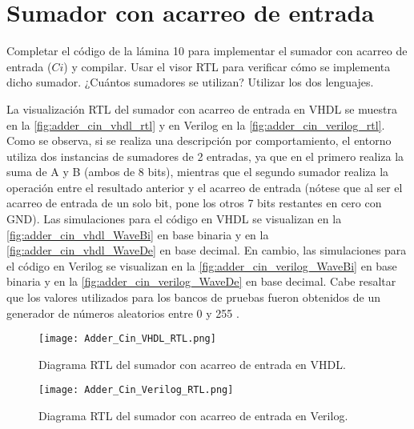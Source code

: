 \section{Sumador con acarreo de entrada \label{sec:s1}}

\begin{center}
	\begin{minipage}{12cm}
		\begin{tcolorbox}[title=Actividad 1]
			Completar el código de la lámina 10 para implementar el sumador con acarreo de entrada ($Ci$) y compilar. Usar el visor RTL para verificar cómo se implementa dicho sumador. ¿Cuántos sumadores se utilizan? Utilizar los dos lenguajes.
		\end{tcolorbox}	
	\end{minipage}
\end{center}

La visualización RTL del sumador con acarreo de entrada en VHDL se muestra en la \autoref{fig:adder_cin_vhdl_rtl} y en Verilog en la \autoref{fig:adder_cin_verilog_rtl}. Como se observa, si se realiza una descripción por comportamiento, el entorno utiliza dos instancias de sumadores de 2 entradas, ya que en el primero realiza la suma de A y B (ambos de 8 bits), mientras que el segundo sumador realiza la operación entre el resultado anterior y el acarreo de entrada (nótese que al ser el acarreo de entrada de un solo bit, pone los otros 7 bits restantes en cero con GND). Las simulaciones para el código en VHDL se visualizan en la \autoref{fig:adder_cin_vhdl_WaveBi} en base binaria y en la \autoref{fig:adder_cin_vhdl_WaveDe} en base decimal. En cambio, las simulaciones para el código en Verilog se visualizan en la \autoref{fig:adder_cin_verilog_WaveBi} en base binaria y en la \autoref{fig:adder_cin_verilog_WaveDe} en base decimal. Cabe resaltar que los valores utilizados para los bancos de pruebas fueron obtenidos de un generador de números aleatorios entre 0 y 255 \cite{numeros_2024}.

\begin{figure}[ht]
	\centering
	\texttt{[image: Adder\_Cin\_VHDL\_RTL.png]}
	\caption{Diagrama RTL del sumador con acarreo de entrada en VHDL. \label{fig:adder_cin_vhdl_rtl}}
\end{figure}

\begin{figure}[ht]
	\centering
	\texttt{[image: Adder\_Cin\_Verilog\_RTL.png]}
	\caption{Diagrama RTL del sumador con acarreo de entrada en Verilog. \label{fig:adder_cin_verilog_rtl}}
\end{figure}

